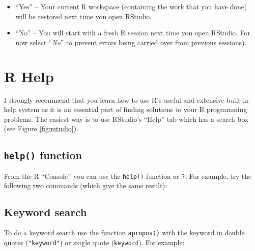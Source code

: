 \documentclass[a4paper,9pt,twocolumn,twoside,printwatermark=false]{pinp}
\providecommand{\tightlist}{%
  \setlength{\itemsep}{0pt}\setlength{\parskip}{0pt}}
\begin{document}
\begin{itemize}
\tightlist
\item
  ``Yes'' -- Your current R workspace (containing the work that you have
  done) will be restored next time you open RStudio.
\item
  ``No'' -- You will start with a fresh R session next time you open
  RStudio. For now select ``\emph{No}'' to prevent errors being carried
  over from previous sessions).
\end{itemize}

\section{R Help}\label{r-help}

I strongly recommend that you learn how to use R's useful and extensive
built-in help system as it is an essential part of finding solutions to
your R programming problems. The easiest way is to use RStudio's
``Help'' tab which has a search box (see Figure \ref{fig:rstudio}).

\subsection{\texorpdfstring{\texttt{help()}
function}{help() function}}\label{help-function}

From the R ``Console'' you can use the \texttt{help()} function or
\texttt{?}. For example, try the following two commands (which give the
same result):

\begin{Shaded}
\begin{Highlighting}[]
\end{Highlighting}
\end{Shaded}

\subsection{Keyword search}\label{keyword-search}

To do a keyword search use the function \texttt{apropos()} with the
keyword in double quotes (\texttt{"keyword"}) or single quote
(\texttt{\textquotesingle{}keyword\textquotesingle{}}). For example:

\begin{Shaded}
\begin{Highlighting}[]
\NormalTok{(}\NormalTok{)}
\end{Highlighting}
\end{Shaded}
\end{document}
